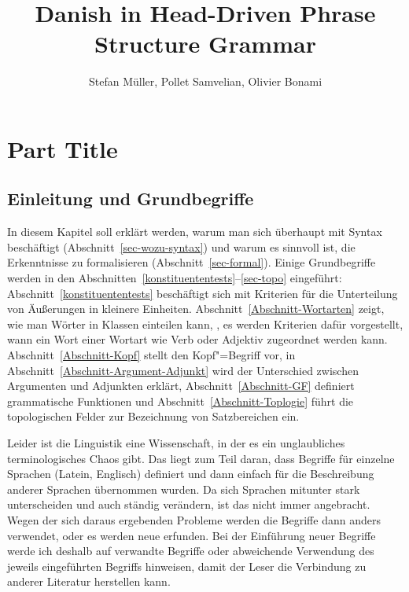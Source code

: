 \documentclass[ number=45
			   ,series=eotms
			   ,printondemand
			  ]{langsci}
\title{Danish in \newlineCover Head-Driven \newlineCover\newlineSpine Phrase Structure \newlineCover Grammar  }
\author{Stefan M\"uller, \newlineCover Pollet Samvelian, \newlineCover Olivier Bonami}
\begin{document}
              
       
                
      
\maketitle                

\tableofcontents


\pagestyle{scrheadings}
  
\part{Part Title}	               



\chapter{Einleitung und Grundbegriffe}
\label{Kapitel-Grundbegriffe}

In diesem Kapitel soll erklärt werden, warum man sich überhaupt mit Syntax beschäftigt
(Abschnitt~\ref{sec-wozu-syntax}) und warum es sinnvoll ist, die Erkenntnisse zu formalisieren
(Abschnitt~\ref{sec-formal}).  Einige Grundbegriffe werden in den
Abschnitten~\ref{konstituententests}--\ref{sec-topo} eingeführt: Abschnitt~\ref{konstituententests}
beschäftigt sich mit Kriterien für die Unterteilung von Äußerungen in kleinere
Einheiten. Abschnitt~\ref{Abschnitt-Wortarten} zeigt, wie man Wörter in Klassen einteilen kann,
\dash, es werden Kriterien dafür vorgestellt, wann ein Wort einer Wortart wie \zb Verb oder Adjektiv
zugeordnet werden kann.  Abschnitt~\ref{Abschnitt-Kopf} stellt den Kopf"=Begriff vor, in
Abschnitt~\ref{Abschnitt-Argument-Adjunkt} wird der Unterschied zwischen Argumenten und Adjunkten
erklärt, Abschnitt~\ref{Abschnitt-GF} definiert grammatische Funktionen und
Abschnitt~\ref{Abschnitt-Toplogie} führt die topologischen Felder zur Bezeichnung von Satzbereichen
ein.

Leider ist die Linguistik eine Wissenschaft, in der es ein unglaubliches terminologisches Chaos
gibt. Das liegt zum Teil daran, dass Begriffe für einzelne Sprachen (\zb Latein, Englisch)
definiert und dann einfach für die Beschreibung anderer Sprachen übernommen wurden. Da sich
Sprachen mitunter stark unterscheiden und auch ständig verändern, ist das nicht immer
angebracht. Wegen der sich daraus ergebenden Probleme werden die Begriffe dann anders verwendet,
oder es werden neue erfunden. 
%
Bei der Einführung neuer Begriffe werde ich deshalb auf verwandte Begriffe oder abweichende
Verwendung des jeweils eingeführten Begriffs hinweisen, damit der Leser die Verbindung zu anderer
Literatur herstellen kann. 
\end{document}
